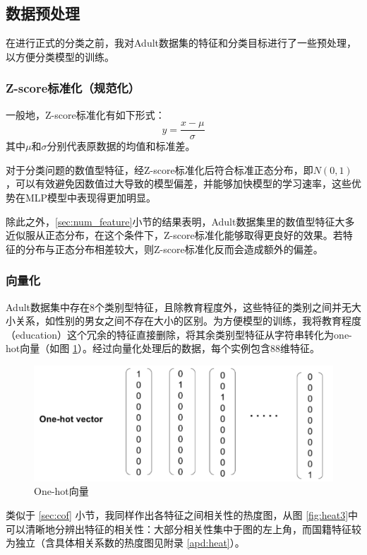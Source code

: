 \documentclass[12pt,a4paper]{article}
\theoremstyle{definition}
\begin{document}
\subsection{数据预处理}

在进行正式的分类之前，我对Adult数据集的特征和分类目标进行了一些预处理，以方便分类模型的训练。

\subsubsection{Z-score标准化（规范化）}

一般地，Z-score标准化有如下形式：
\begin{equation}
	y = \dfrac{x - \mu}{\sigma}
\end{equation}
其中$\mu$和$\sigma$分别代表原数据的均值和标准差。

\vspace{0.01\linewidth}
对于分类问题的数值型特征，经Z-score标准化后符合标准正态分布，即$N(0, 1)$，可以有效避免因数值过大导致的模型偏差，并能够加快模型的学习速率，这些优势在MLP模型中表现得更加明显。

\vspace{0.01\linewidth}
除此之外，\ref{sec:num_feature}小节的结果表明，Adult数据集里的数值型特征大多近似服从正态分布，在这个条件下，Z-score标准化能够取得更良好的效果。若特征的分布与正态分布相差较大，则Z-score标准化反而会造成额外的偏差。

\subsubsection{向量化}

Adult数据集中存在8个类别型特征，且除教育程度外，这些特征的类别之间并无大小关系，如性别的男女之间不存在大小的区别。为方便模型的训练，我将教育程度（education）这个冗余的特征直接删除，将其余类别型特征从字符串转化为one-hot向量（如图 \ref{fig:onehot}）。经过向量化处理后的数据，每个实例包含88维特征。

\begin{figure}[H]
	\centering
	\includegraphics[width=0.35\linewidth]{img/onehot.png}
	\caption{One-hot向量}
	\label{fig:onehot}
\end{figure}

\vspace{0.01\linewidth}
类似于 \ref{sec:cof} 小节，我同样作出各特征之间相关性的热度图，从图 \ref{fig:heat3}中可以清晰地分辨出特征的相关性：大部分相关性集中于图的左上角，而国籍特征较为独立（含具体相关系数的热度图见附录 \ref{apd:heat}）。
\end{document}

